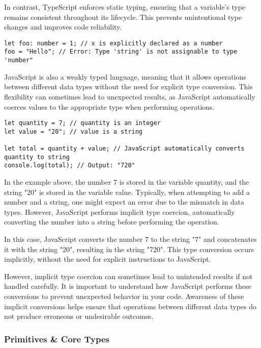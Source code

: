 In contrast, TypeScript enforces static typing, ensuring that a variable's type remains consistent throughout its lifecycle. This prevents unintentional type changes and improves code reliability.

\begin{lstlisting}[caption=Statically Typed Language TypeScript]
let foo: number = 1; // x is explicitly declared as a number
foo = "Hello"; // Error: Type 'string' is not assignable to type 'number"
\end{lstlisting}

JavaScript is also a weakly typed language, meaning that it allows operations between different data types without the need for explicit type conversion. This flexibility can sometimes lead to unexpected results, as JavaScript automatically coerces values to the appropriate type when performing operations.

\begin{lstlisting}[caption=Automatic type conversion in JavaScript]
let quantity = 7; // quantity is an integer
let value = "20"; // value is a string

let total = quantity + value; // JavaScript automatically converts quantity to string
console.log(total); // Output: "720"
\end{lstlisting}

In the example above, the number 7 is stored in the variable quantity, and the string "20" is stored in the variable value. Typically, when attempting to add a number and a string, one might expect an error due to the mismatch in data types. However, JavaScript performs implicit type coercion, automatically converting the number into a string before performing the operation.

In this case, JavaScript converts the number 7 to the string "7" and concatenates it with the string "20", resulting in the string "720". This type conversion occurs implicitly, without the need for explicit instructions to JavaScript.

However, implicit type coercion can sometimes lead to unintended results if not handled carefully. It is important to understand how JavaScript performs these conversions to prevent unexpected behavior in your code. Awareness of these implicit conversions helps ensure that operations between different data types do not produce erroneous or undesirable outcomes.

\subsubsection{Primitives \& Core Types}

